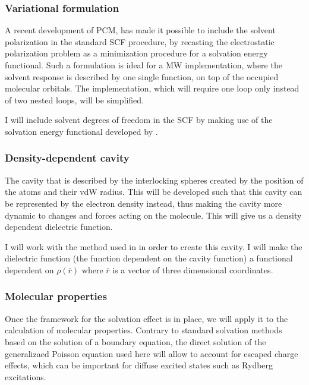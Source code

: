 \documentclass[a4paper,11pt]{article}
\begin{document}
\subsubsection{Variational formulation}

A recent development of \ac{PCM}, has made it possible to include the
solvent polarization in the standard
\ac{SCF} procedure, by recasting the electrostatic polarization
problem as a minimization procedure for a solvation energy
functional\cite{Lipparini:2010bg}. Such a formulation is
ideal for a
\ac{MW} implementation, where the solvent response is described by one
single function, on top of the occupied molecular
orbitals. The implementation, which
will require one loop only instead of two nested loops, will be simplified.

I will include solvent degrees of freedom in the \ac{SCF} by making use of the
solvation energy functional developed by \cite{Lipparini:2010bg}.

\subsubsection{Density-dependent cavity}

The cavity that is described by the interlocking spheres created by
the position of the atoms and their \ac{vdW} radius. This will be
developed such that this cavity can be represented by the electron
density instead, thus making the cavity more dynamic to changes and
forces acting on the molecule. This will give us a density dependent
dielectric function.

I will work with the method used in \cite{FossoTande:2013ka} in order
to create this cavity. I will make the dielectric function (the function
dependent on the cavity function) a functional dependent on $\rho(\bar{r})$
where $\bar{r}$ is a vector of three dimensional coordinates.

\subsubsection{Molecular properties}

Once the framework for the solvation effect is in place, we will apply
it to the calculation of molecular properties. Contrary to standard
solvation methods based on the solution of a boundary equation, the
direct solution of the generalizaed Poisson equation used here will allow to
account for escaped charge effects, which can be important for diffuse
excited states such as Rydberg excitations.
\end{document}

